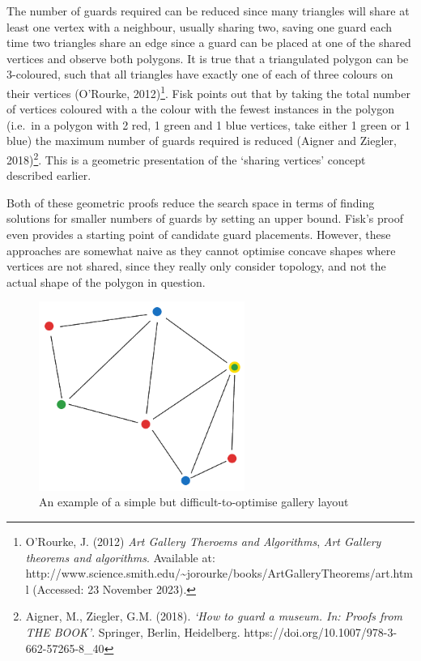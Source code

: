 \documentclass[
]{article}
\begin{document}
The number of guards required can be reduced since many triangles will
share at least one vertex with a neighbour, usually sharing two, saving
one guard each time two triangles share an edge since a guard can be
placed at one of the shared vertices and observe both polygons. It is
true that a triangulated polygon can be 3-coloured, such that all
triangles have exactly one of each of three colours on their vertices
(O'Rourke, 2012)\footnote{O'Rourke, J. (2012) \emph{Art Gallery Theroems
  and Algorithms}, \emph{Art Gallery theorems and algorithms}. Available
  at:
  http://www.science.smith.edu/\textasciitilde jorourke/books/ArtGalleryTheorems/art.html
  (Accessed: 23 November 2023).}. Fisk points out that by taking the
total number of vertices coloured with a the colour with the fewest
instances in the polygon (i.e.~in a polygon with 2 red, 1 green and 1
blue vertices, take either 1 green or 1 blue) the maximum number of
guards required is reduced (Aigner and Ziegler, 2018)\footnote{Aigner,
  M., Ziegler, G.M. (2018). \emph{`How to guard a museum. In: Proofs
  from THE BOOK'}. Springer, Berlin, Heidelberg.
  https://doi.org/10.1007/978-3-662-57265-8\_40}. This is a geometric
presentation of the `sharing vertices' concept described earlier.

Both of these geometric proofs reduce the search space in terms of
finding solutions for smaller numbers of guards by setting an upper
bound. Fisk's proof even provides a starting point of candidate guard
placements. However, these approaches are somewhat naive as they cannot
optimise concave shapes where vertices are not shared, since they really
only consider topology, and not the actual shape of the polygon in
question.

\begin{figure}
\centering
\includegraphics[width=0.6\textwidth,height=\textheight]{diagrams/Complicated Gallery.png}
\caption{An example of a simple but difficult-to-optimise gallery
layout}
\end{figure}
\end{document}
